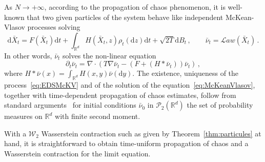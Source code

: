 \documentclass[AHL,Unicode,longabstracts,published]{cedram}
\newcommand{\R}{\mathbb R}
\newcommand{\clP}{\mathcal P}
\newcommand{\clW}{\mathcal W}
\newcommand{\clL}{\mathcal L}
\newcommand{\dd}{\mathrm{d}}
\newcommand{\na}{\nabla}
\newcommand{\1}{\mathbbm{1}}
\newcommand{\R}{\mathbb R}
\newcommand{\clW}{\mathcal W}
\begin{document}
As $N\rightarrow +\infty$, according to the propagation of chaos phenomenon, it is well-known that two given particles of the system behave like independent McKean-Vlasov processes solving
\begin{equation}\label{eq:EDSMcKV}
\dd \bar X_t = F(\bar X_t) \dd t + \int_{\R^d} H\left(\bar X_t,z\right) \rho_t(\dd z) \dd t + \sqrt{2T} \dd B_t\,,\qquad \bar \nu_t = \clL aw\left(\bar X_t\right)\,.
\end{equation}
In other words, $\bar \nu_t$ solves the non-linear equation
\begin{equation}\label{eq:McKeanVlasov}
\partial_t \bar \nu_t = \na\cdot \left( T\na\bar \nu_t - \left(F+ \left(H\ast \bar \nu_t\right)\right)\bar \nu_t\right) \,,
\end{equation}
where $ H\ast\bar \nu (x) = \int_{\R^d} H(x,y)\bar \nu(\dd y)$. The existence, uniqueness of the process~\eqref{eq:EDSMcKV} and of the solution of the equation~\eqref{eq:McKeanVlasov}, together with time-dependent propagation of chaos estimates, follow from standard arguments~\cite{Meleard,Sznitman} for initial conditions $\bar\nu_0$ in $\clP_2(\R^d)$ the set of probability measures on $\R^d$ with finite second moment.

With a $\clW_2$ Wasserstein contraction such as given by Theorem~\ref{thm:particules} at hand, it is straightforward to obtain time-uniform propagation of chaos and a Wasserstein contraction for the limit equation.
\end{document}
